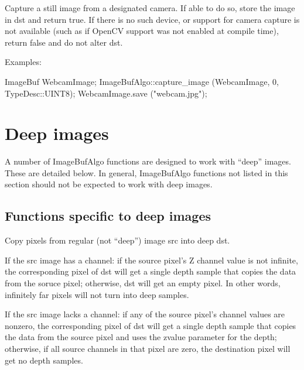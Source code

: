  
Capture a still image from a designated camera.  If able to do so,
store the image in {\cf dst} and return {\cf true}.  If there is no such device,
or support for camera capture is not available (such as if OpenCV
support was not enabled at compile time), return {\cf false} and do not
alter {\cf dst}.

\smallskip
\noindent Examples:
\begin{code}
    ImageBuf WebcamImage;
    ImageBufAlgo::capture_image (WebcamImage, 0, TypeDesc::UINT8);
    WebcamImage.save ("webcam.jpg");
\end{code}
\apiend



\section{Deep images}
\label{sec:iba:deep}

A number of {\cf ImageBufAlgo} functions are designed to work with ``deep''
images. These are detailed below. In general, {\cf ImageBufAlgo} functions
not listed in this section should not be expected to work with deep images.

\subsection{Functions specific to deep images}

  
Copy pixels from regular (not ``deep'') image {\cf src} into deep {\cf dst}.

If the {\cf src} image has a  channel: if the source pixel's {\cf Z}
channel value is not infinite, the corresponding pixel of {\cf dst} will get
a single depth sample that copies the data from the soruce pixel; otherwise,
{\cf dst} will get an empty pixel. In other words, infinitely far pixels
will not turn into deep samples.

If the {\cf src} image lacks a  channel: if any of the source pixel's
channel values are nonzero, the corresponding pixel of {\cf dst} will get a
single depth sample that copies the data from the source pixel and uses the
{\cf zvalue} parameter for the depth; otherwise, if all source channels in
that pixel are zero, the destination pixel will get no depth samples.


